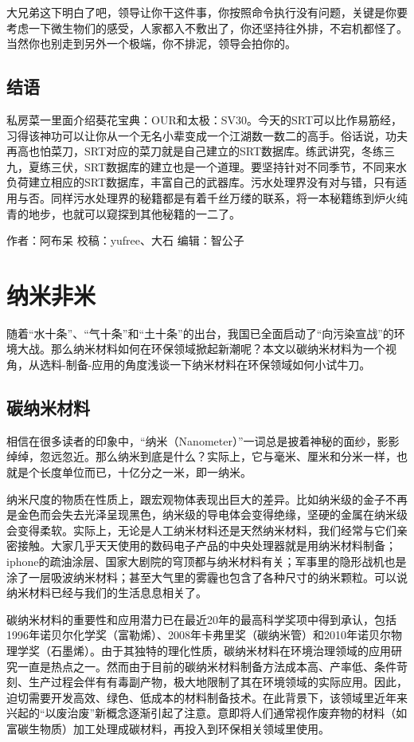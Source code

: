 \documentclass[]{book}
\begin{document}
大兄弟这下明白了吧，领导让你干这件事，你按照命令执行没有问题，关键是你要考虑一下微生物们的感受，人家都入不敷出了，你还坚持往外排，不宕机都怪了。当然你也别走到另外一个极端，你不排泥，领导会拍你的。

\subsection{结语}\label{-3}

私房菜一里面介绍葵花宝典：OUR和太极：SV30。今天的SRT可以比作易筋经，习得该神功可以让你从一个无名小辈变成一个江湖数一数二的高手。俗话说，功夫再高也怕菜刀，SRT对应的菜刀就是自己建立的SRT数据库。练武讲究，冬练三九，夏练三伏，SRT数据库的建立也是一个道理。要坚持针对不同季节，不同来水负荷建立相应的SRT数据库，丰富自己的武器库。污水处理界没有对与错，只有适用与否。同样污水处理界的秘籍都是有着千丝万缕的联系，将一本秘籍练到炉火纯青的地步，也就可以窥探到其他秘籍的一二了。

作者：阿布呆 校稿：yufree、大石 编辑：智公子

\section{纳米非米}

随着``水十条''、``气十条''和``土十条''的出台，我国已全面启动了``向污染宣战''的环境大战。那么纳米材料如何在环保领域掀起新潮呢？本文以碳纳米材料为一个视角，从选料-制备-应用的角度浅谈一下纳米材料在环保领域如何小试牛刀。

\subsection{碳纳米材料}

相信在很多读者的印象中，``纳米（Nanometer）''一词总是披着神秘的面纱，影影绰绰，忽远忽近。那么纳米到底是什么？实际上，它与毫米、厘米和分米一样，也就是个长度单位而已，十亿分之一米，即一纳米。

纳米尺度的物质在性质上，跟宏观物体表现出巨大的差异。比如纳米级的金子不再是金色而会失去光泽呈现黑色，纳米级的导电体会变得绝缘，坚硬的金属在纳米级会变得柔软。实际上，无论是人工纳米材料还是天然纳米材料，我们经常与它们亲密接触。大家几乎天天使用的数码电子产品的中央处理器就是用纳米材料制备；iphone的疏油涂层、国家大剧院的穹顶都与纳米材料有关；军事里的隐形战机也是涂了一层吸波纳米材料；甚至大气里的雾霾也包含了各种尺寸的纳米颗粒。可以说纳米材料已经与我们的生活息息相关了。

碳纳米材料的重要性和应用潜力已在最近20年的最高科学奖项中得到承认，包括1996年诺贝尔化学奖（富勒烯）、2008年卡弗里奖（碳纳米管）和2010年诺贝尔物理学奖（石墨烯）。由于其独特的理化性质，碳纳米材料在环境治理领域的应用研究一直是热点之一。然而由于目前的碳纳米材料制备方法成本高、产率低、条件苛刻、生产过程会伴有有毒副产物，极大地限制了其在环境领域的实际应用。因此，迫切需要开发高效、绿色、低成本的材料制备技术。在此背景下，该领域里近年来兴起的``以废治废''新概念逐渐引起了注意。意即将人们通常视作废弃物的材料（如富碳生物质）加工处理成碳材料，再投入到环保相关领域里使用。
\end{document}
